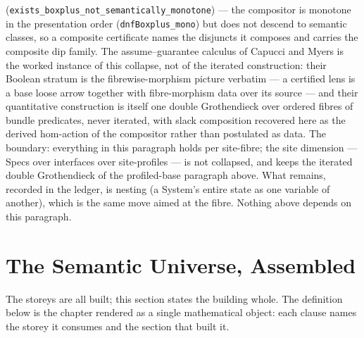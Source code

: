 (\texttt{exists\_boxplus\_not\_semantically\_monotone}) --- the
compositor is monotone in the presentation order
(\texttt{dnfBoxplus\_mono}) but does not descend to semantic
classes, so a composite certificate names the disjuncts it
composes and carries the composite dip family. The
assume--guarantee calculus of Capucci and Myers
\cite{capuccimyers2026} is the worked instance of this collapse,
not of the iterated construction: their Boolean stratum is the
fibrewise-morphism picture verbatim --- a certified lens is a base
loose arrow together with fibre-morphism data over its source ---
and their quantitative construction is itself one double
Grothendieck over ordered fibres of bundle predicates, never
iterated, with slack composition recovered here as the derived
hom-action of the compositor rather than postulated as data. The
boundary: everything in
this paragraph holds per site-fibre; the site dimension --- Specs
over interfaces over site-profiles --- is not collapsed, and keeps
the iterated double Grothendieck of the profiled-base paragraph
above. What remains, recorded in the ledger, is nesting (a
System's entire state as one variable of another), which is the
same move aimed at the fibre. Nothing above depends on this
paragraph.

\section{The Semantic Universe, Assembled}
\label{sec:su-total}

The storeys are all built; this section states the building whole.
The definition below is the chapter rendered as a single
mathematical object: each clause names the storey it consumes and
the section that built it.

